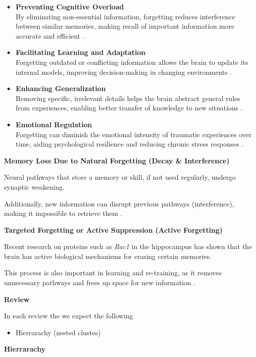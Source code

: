 \documentclass{book}
\providecommand{\ProjectDeepHeading}[2]{%
    \par\medskip\noindent\textbf{#2}\par\smallskip
}
\begin{document}
        \begin{itemize}
            \item \textbf{Preventing Cognitive Overload} \\
                By eliminating non-essential information, forgetting reduces interference between similar memories, making recall of important information more accurate and efficient .
            \item \textbf{Facilitating Learning and Adaptation} \\
                Forgetting outdated or conflicting information allows the brain to update its internal models, improving decision-making in changing environments .
            \item \textbf{Enhancing Generalization} \\
                Removing specific, irrelevant details helps the brain abstract general rules from experiences, enabling better transfer of knowledge to new situations .
            \item \textbf{Emotional Regulation} \\
                Forgetting can diminish the emotional intensity of traumatic experiences over time, aiding psychological resilience and reducing chronic stress responses .
        \end{itemize}

        \ProjectDeepHeading{7}{Memory Loss Due to Natural Forgetting (Decay \& Interference)}
        Neural pathways that store a memory or skill, if not used regularly, undergo synaptic weakening.

        Additionally, new information can disrupt previous pathways (interference), making it impossible to retrieve them .

        \ProjectDeepHeading{7}{Targeted Forgetting or Active Suppression (Active Forgetting)}
        Recent research on proteins such as \textit{Rac1} in the hippocampus has shown that the brain has active biological mechanisms for erasing certain memories.

        This process is also important in learning and re-training, as it removes unnecessary pathways and frees up space for new information .



    \ProjectDeepHeading{6}{Review}
        In each review the we expect the following
        \begin{itemize}
            \item Hierrarachy (nested clustes)
        \end{itemize}
        \ProjectDeepHeading{7}{Hierrarachy}
\end{document}
